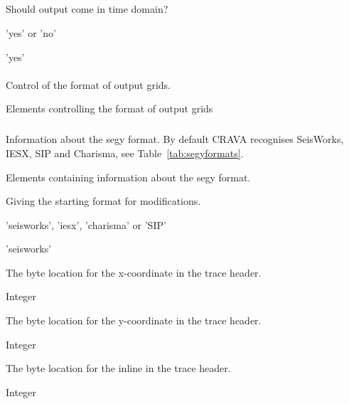 \subparagraph{}
 \slist
   \item \Description Should output come in time domain?
   \item \Argument 'yes' or 'no'
   \item \Default 'yes'
 \elist

\paragraph{}
 \slist
   \item \Description Control of the format of output grids.
   \item \Argument Elements controlling the format of output grids
   \item \Default
 \elist

\subparagraph{}
 \slist
   \item \Description Information about the segy format. By default CRAVA recognises SeisWorks, IESX, SIP and Charisma, see Table~\ref{tab:segyformats}.
   \item \Argument Elements containing information about the segy format.
   \item \Default
 \elist

 \slist
   \item \Description Giving the starting format for modifications.
   \item \Argument 'seisworks', 'iesx', 'charisma' or 'SIP'
   \item \Default 'seisworks'
 \elist

 \slist
   \item \Description The byte location for the x-coordinate in the trace header.
   \item \Argument Integer
   \item \Default
 \elist

 \slist
   \item \Description The byte location for the y-coordinate in the trace header.
   \item \Argument Integer
   \item \Default
 \elist

 \slist
   \item \Description The byte location for the inline in the trace header.
   \item \Argument Integer
   \item \Default
 \elist

